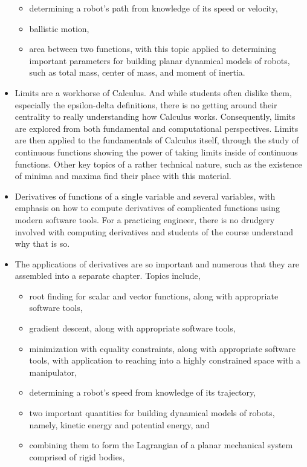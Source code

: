 \begin{itemize}
    \begin{itemize}
        \item determining a robot's path from knowledge of its speed or velocity, 
        \item ballistic motion,
        \item area between two functions, with this topic applied to determining important parameters for building planar dynamical models of robots, such as total mass, center of mass, and moment of inertia.
    \end{itemize}
    \item Limits are a workhorse of Calculus. And while students often dislike them, especially the epsilon-delta definitions, there is no getting around their centrality to really understanding how Calculus works. Consequently, limits are explored from both fundamental and computational perspectives. Limits are then applied to the fundamentals of Calculus itself, through the study of continuous functions showing the power of taking limits inside of continuous functions. Other key topics of a rather technical nature, such as the existence of minima and maxima find their place with this material.
    \item Derivatives of functions of a single variable and several variables, with emphasis on how to compute derivatives of complicated functions using modern software tools. For a practicing engineer, there is no drudgery involved with computing derivatives and students of the course understand why that is so.
    \item The applications of derivatives are so important and numerous that they are assembled into a separate chapter. Topics include,
        \begin{itemize}
        \item root finding for scalar and vector functions, along with appropriate software tools,
        \item gradient descent, along with appropriate software tools,
        \item minimization with equality constraints, along with appropriate software tools, with application to reaching into a highly constrained space with a manipulator,
        \item determining a robot's speed from knowledge of its trajectory, 
        \item two important quantities for building dynamical models of robots, namely, kinetic energy and potential energy, and 
        \item combining them to form the Lagrangian of a planar mechanical system comprised of rigid bodies,

\end{itemize}
\end{itemize}
